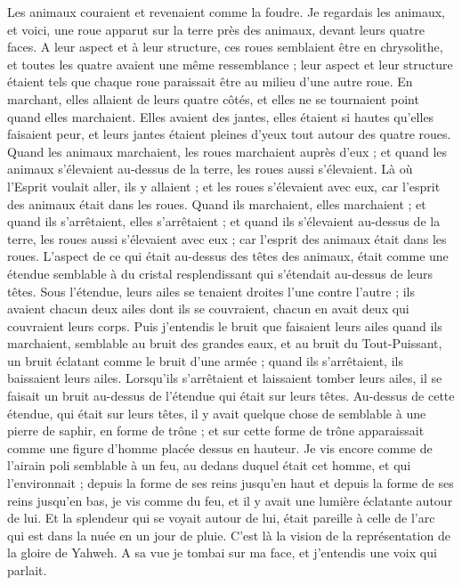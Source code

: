 \begin{multicols}{2}
Les animaux couraient et revenaient comme la foudre.
Je regardais les animaux, et voici, une roue apparut sur la terre près des animaux, devant leurs quatre faces.
A leur aspect et à leur structure, ces roues semblaient être en chrysolithe, et toutes les quatre avaient une même ressemblance ; leur aspect et leur structure étaient tels que chaque roue paraissait être au milieu d'une autre roue.
En marchant, elles allaient de leurs quatre côtés, et elles ne se tournaient point quand elles marchaient.
Elles avaient des jantes, elles étaient si hautes qu’elles faisaient peur, et leurs jantes étaient pleines d'yeux tout autour des quatre roues.
Quand les animaux marchaient, les roues marchaient auprès d'eux ; et quand les animaux s'élevaient au-dessus de la terre, les roues aussi s'élevaient.
Là où l'Esprit voulait aller, ils y allaient ; et les roues s'élevaient avec eux, car l'esprit des animaux était dans les roues.
Quand ils marchaient, elles marchaient ; et quand ils s'arrêtaient, elles s'arrêtaient ; et quand ils s'élevaient au-dessus de la terre, les roues aussi s'élevaient avec eux ; car l'esprit des animaux était dans les roues.
L’aspect de ce qui était au-dessus des têtes des animaux, était comme une étendue semblable à du cristal resplendissant qui s'étendait au-dessus de leurs têtes.
Sous l'étendue, leurs ailes se tenaient droites l'une contre l'autre ; ils avaient chacun deux ailes dont ils se couvraient, chacun en avait deux qui couvraient leurs corps.
Puis j’entendis le bruit que faisaient leurs ailes quand ils marchaient, semblable au bruit des grandes eaux, et au bruit du Tout-Puissant, un bruit éclatant comme le bruit d'une armée ; quand ils s'arrêtaient, ils baissaient leurs ailes.
Lorsqu’ils s'arrêtaient et laissaient tomber leurs ailes, il se faisait un bruit au-dessus de l'étendue qui était sur leurs têtes.
Au-dessus de cette étendue, qui était sur leurs têtes, il y avait quelque chose de semblable à une pierre de saphir, en forme de trône ; et sur cette forme de trône apparaissait comme une figure d’homme placée dessus en hauteur.
Je vis encore comme de l’airain poli semblable à un feu, au dedans duquel était cet homme, et qui l’environnait ; depuis la forme de ses reins jusqu’en haut et depuis la forme de ses reins jusqu'en bas, je vis comme du feu, et il y avait une lumière éclatante autour de lui.
Et la splendeur qui se voyait autour de lui, était pareille à celle de l'arc qui est dans la nuée en un jour de pluie. C'est là la vision de la représentation de la gloire de Yahweh. A sa vue je tombai sur ma face, et j'entendis une voix qui parlait.

\end{multicols}
